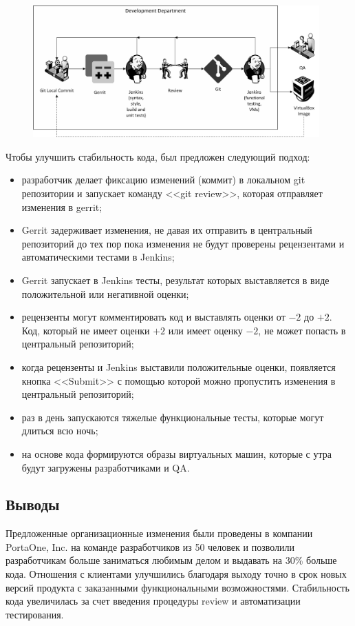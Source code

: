 \documentclass[10pt, a5paper]{article}
\begin{document}
\begin{figure}[b]
  \centering
  \includegraphics[width=11cm]{05_review.png} 
\end{figure}

Чтобы улучшить стабильность кода, был предложен следующий подход:

\begin{itemize}
  \item разработчик делает фиксацию изменений (коммит) в локальном git репозитории и запускает команду <<git review>>, которая отправляет изменения в gerrit;
  \item Gerrit задерживает изменения, не давая их отправить в центральный репозиторий до тех пор пока изменения не будут проверены рецензентами и автоматическими тестами в Jenkins;
  \item Gerrit запускает в Jenkins тесты, результат которых выставляется в виде положительной или негативной оценки;
  \item рецензенты могут комментировать код и выставлять оценки от $-2$ до $+2$. Код, который не имеет оценки $+2$ или имеет оценку $-2$, не может попасть в центральный репозиторий;
  \item когда рецензенты и Jenkins выставили положительные оценки, появляется кнопка <<Submit>> с помощью которой можно пропустить изменения в центральный репозиторий;
  \item раз в день запускаются тяжелые функциональные тесты, которые могут длиться всю ночь;
  \item на основе кода формируются образы виртуальных машин, которые с утра будут загружены разработчиками и QA.
\end{itemize}

\subsection*{Выводы}

Предложенные организационные изменения были проведены в компании PortaOne, Inc. на команде разработчиков из 50 человек и позволили разработчикам больше заниматься любимым делом и выдавать на 30\% больше кода. Отношения с клиентами улучшились благодаря выходу точно в срок новых версий продукта с заказанными функциональными возможностями. Стабильность кода увеличилась за счет введения процедуры review и автоматизации тестирования.
\end{document}
